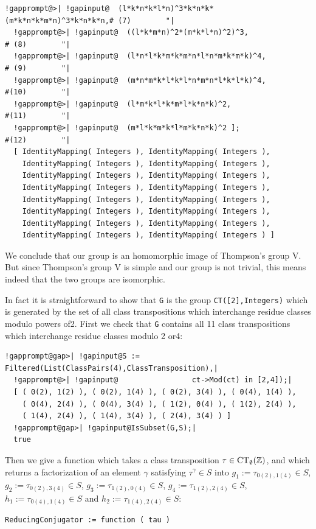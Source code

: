 \documentclass[a4paper,11pt]{report}
\begin{document}
{{\begin{Verbatim}[commandchars=!@|,fontsize=\small,frame=single,label=Example]
  !gapprompt@>| !gapinput@  (l*k*n*k*l*n)^3*k*n*k*(m*k*n*k*m*n)^3*k*n*k*n,# (7)        "|
  !gapprompt@>| !gapinput@  ((l*k*m*n)^2*(m*k*l*n)^2)^3,                  # (8)        "|
  !gapprompt@>| !gapinput@  (l*n*l*k*m*k*m*n*l*n*m*k*m*k)^4,              # (9)        "|
  !gapprompt@>| !gapinput@  (m*n*m*k*l*k*l*n*m*n*l*k*l*k)^4,              #(10)        "|
  !gapprompt@>| !gapinput@  (l*m*k*l*k*m*l*k*n*k)^2,                      #(11)        "|
  !gapprompt@>| !gapinput@  (m*l*k*m*k*l*m*k*n*k)^2 ];                    #(12)        "|
  [ IdentityMapping( Integers ), IdentityMapping( Integers ), 
    IdentityMapping( Integers ), IdentityMapping( Integers ), 
    IdentityMapping( Integers ), IdentityMapping( Integers ), 
    IdentityMapping( Integers ), IdentityMapping( Integers ), 
    IdentityMapping( Integers ), IdentityMapping( Integers ), 
    IdentityMapping( Integers ), IdentityMapping( Integers ), 
    IdentityMapping( Integers ), IdentityMapping( Integers ), 
    IdentityMapping( Integers ), IdentityMapping( Integers ) ]
\end{Verbatim}
 We conclude that our group is an homomorphic image of Thompson's group V. But
since Thompson's group V is simple and our group is not trivial, this means
indeed that the two groups are isomorphic. 

 In fact it is straightforward to show that \texttt{G} is the group \texttt{CT([2],Integers)} which is generated by the set of all class transpositions which interchange
residue classes modulo powers of{\nobreakspace}2. First we check that \texttt{G} contains all 11 class transpositions which interchange residue classes modulo
2 or{\nobreakspace}4: 
\begin{Verbatim}[commandchars=!@|,fontsize=\small,frame=single,label=Example]
  !gapprompt@gap>| !gapinput@S := Filtered(List(ClassPairs(4),ClassTransposition),|
  !gapprompt@>| !gapinput@                 ct->Mod(ct) in [2,4]);|
  [ ( 0(2), 1(2) ), ( 0(2), 1(4) ), ( 0(2), 3(4) ), ( 0(4), 1(4) ), 
    ( 0(4), 2(4) ), ( 0(4), 3(4) ), ( 1(2), 0(4) ), ( 1(2), 2(4) ), 
    ( 1(4), 2(4) ), ( 1(4), 3(4) ), ( 2(4), 3(4) ) ]
  !gapprompt@gap>| !gapinput@IsSubset(G,S);|
  true
\end{Verbatim}
 Then we give a function which takes a class transposition $\tau \in {\rm CT}_\emptyset({\ensuremath{\mathbb Z}})$, and which returns a factorization of an element $\gamma$ satisfying $\tau^\gamma \in S$ into $g_1 := \tau_{0(2),1(4)} \in S$, $g_2 := \tau_{0(2),3(4)} \in S$, $g_3 := \tau_{1(2),0(4)} \in S$, $g_4 := \tau_{1(2),2(4)} \in S$, $h_1 := \tau_{0(4),1(4)} \in S$ and $h_2 := \tau_{1(4),2(4)} \in S$: 
\begin{Verbatim}[commandchars=!@|,fontsize=\small,frame=single,label=GAP code]
  ReducingConjugator := function ( tau )
  

\end{Verbatim}}}
\end{document}
